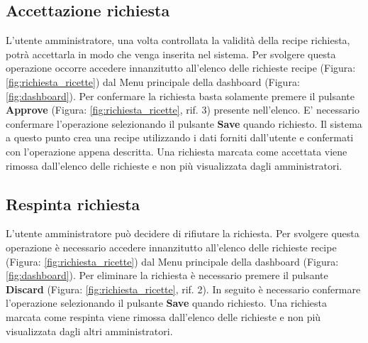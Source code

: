 	\pagebreak
	\subsection{Accettazione richiesta}
		L'utente amministratore, una volta controllata la validità della recipe\gloss{} richiesta, potrà accettarla in modo che venga inserita nel sistema\gloss{}.\newline
		Per svolgere questa operazione occorre accedere innanzitutto all'elenco delle richieste recipe\gloss{} (Figura: \ref{fig:richiesta_ricette}) dal Menu principale della dashboard\gloss{} (Figura: \ref{fig:dashboard}).\newline
		Per confermare la richiesta basta solamente premere il pulsante \textbf{Approve} (Figura: \ref{fig:richiesta_ricette}, rif. 3) presente nell'elenco.\newline
		E' necessario confermare l'operazione selezionando il pulsante \textbf{Save} quando richiesto.\newline
		Il sistema a questo punto crea una recipe\gloss{} utilizzando i dati forniti dall'utente e confermati con l'operazione appena descritta.\newline
		Una richiesta marcata come accettata viene rimossa dall'elenco delle richieste e non più visualizzata dagli amministratori.\newline


	\subsection{Respinta richiesta}
		L'utente amministratore può decidere di rifiutare la richiesta.
		Per svolgere questa operazione è necessario accedere innanzitutto all'elenco delle richieste recipe\gloss{} (Figura: \ref{fig:richiesta_ricette}) dal Menu principale della dashboard\gloss{} (Figura: \ref{fig:dashboard}).\newline
		Per eliminare la richiesta è necessario premere il pulsante \textbf{Discard} (Figura: \ref{fig:richiesta_ricette}, rif. 2). In seguito è necessario confermare l'operazione selezionando il pulsante \textbf{Save} quando richiesto.\newline
		Una richiesta marcata come respinta viene rimossa dall'elenco delle richieste e non più visualizzata dagli altri amministratori.


